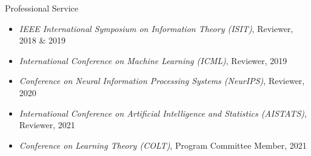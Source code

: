 \documentclass{resume}
\begin{document}
\begin{rSection}{Professional Service}

\begin{itemize}[leftmargin=1em,itemsep=3pt,parsep=0pt,topsep=0pt]
\item {\textit{IEEE International Symposium on Information Theory (ISIT)}, Reviewer, 2018 \& 2019}
\item {\textit{International Conference on Machine Learning (ICML)}, Reviewer, 2019}
\item {\textit{Conference on Neural Information Processing Systems (NeurIPS)}, Reviewer, 2020}
\item {\textit{International Conference on Artificial Intelligence and Statistics (AISTATS)}, Reviewer, 2021}
\item {\textit{Conference on Learning Theory (COLT)}, Program Committee Member, 2021}
\end{itemize}
\end{rSection}
\end{document}
